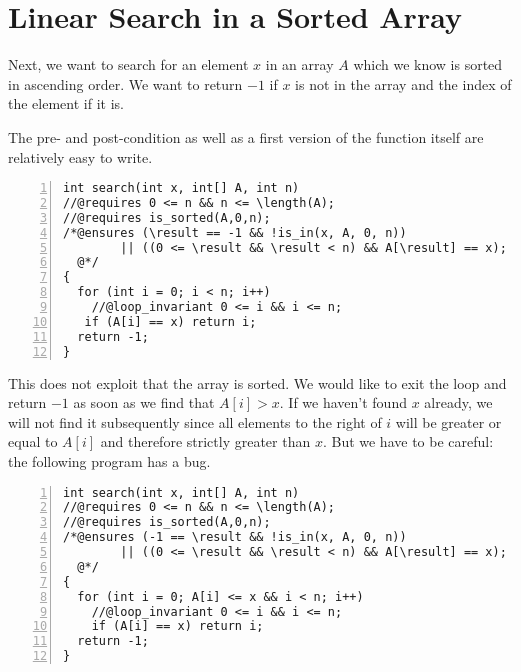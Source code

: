 


\section{Linear Search in a Sorted Array}
\label{sec:linsearch:sorted}

Next, we want to search for an element $x$ in an array $A$ which we
know is sorted in ascending order.  We want to return $-1$ if
$x$ is not in the array and the index of the element if it is.

The pre- and post-condition as well as a first version of the function
itself are relatively easy to write.
%
\begin{lstlisting}[language={[C0]C}, numbers=left]
int search(int x, int[] A, int n)
//@requires 0 <= n && n <= \length(A);
//@requires is_sorted(A,0,n);
/*@ensures (\result == -1 && !is_in(x, A, 0, n))
        || ((0 <= \result && \result < n) && A[\result] == x);
  @*/
{
  for (int i = 0; i < n; i++)
    //@loop_invariant 0 <= i && i <= n;
   if (A[i] == x) return i;
  return -1;
}
\end{lstlisting}


This does not exploit that the array is sorted.  We would like
to exit the loop and return $-1$ as soon as we find that
$A[i] > x$.  If we haven't found $x$ already, we will not find
it subsequently since all elements to the right of $i$ will be
greater or equal to $A[i]$ and therefore strictly greater than
$x$.  But we have to be careful: the following program has a bug.

\clearpage
%
\begin{lstlisting}[language={[C0]C}, numbers=left]
int search(int x, int[] A, int n)
//@requires 0 <= n && n <= \length(A);
//@requires is_sorted(A,0,n);
/*@ensures (-1 == \result && !is_in(x, A, 0, n))
        || ((0 <= \result && \result < n) && A[\result] == x);
  @*/
{
  for (int i = 0; A[i] <= x && i < n; i++)
    //@loop_invariant 0 <= i && i <= n;
    if (A[i] == x) return i;
  return -1;
}
\end{lstlisting}

